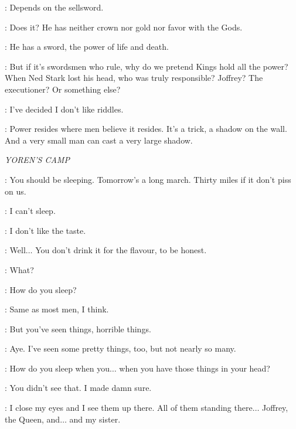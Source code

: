 \TYRION: Depends on the sellsword. 

\VARYS: Does it? He has neither crown nor gold nor favor with the Gods. 

\TYRION: He has a sword, the power of life and death. 

\VARYS: But if it's swordsmen who rule, why do we pretend Kings hold all the power? When Ned Stark lost his head, who was truly responsible? Joffrey? The executioner? Or something else? 

\TYRION: I've decided I don't like riddles. 

\VARYS: Power resides where men believe it resides. It's a trick, a shadow on the wall. And a very small man can cast a very large shadow. 


\scene

\textit{YOREN'S CAMP} 


\YOREN: You should be sleeping. Tomorrow's a long march. Thirty miles if it don't piss on us. 

\ARYA: I can't sleep. 


\ARYA: I don't like the taste. 

\YOREN: Well$\ldots$ You don't drink it for the flavour, to be honest. 


\YOREN: What? 

\ARYA: How do you sleep? 

\YOREN: Same as most men, I think. 

\ARYA: But you've seen things, horrible things. 

\YOREN: Aye. I've seen some pretty things, too, but not nearly so many. 

\ARYA: How do you sleep when you$\ldots$ when you have those things in your head? 

\YOREN: You didn't see that. I made damn sure. 

\ARYA: I close my eyes and I see them up there. All of them standing there$\ldots$ Joffrey, the Queen, and$\ldots$ and my sister. 

